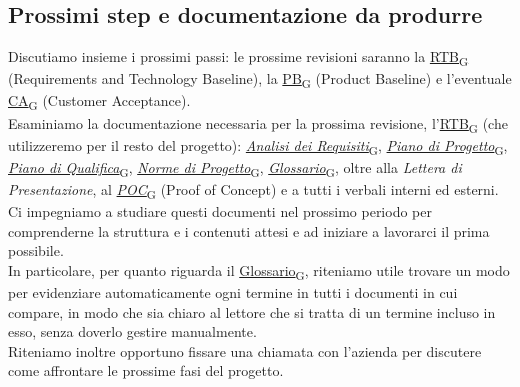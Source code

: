 \documentclass[italian,12pt]{article} %
\begin{document}
\subsection{Prossimi step e documentazione da produrre}
Discutiamo insieme i prossimi passi: le prossime revisioni saranno la \href{https://7last.github.io/docs/rtb/documentazione-interna/glossario#rtb}{RTB\textsubscript{G}}
(Requirements and Technology Baseline), la \href{https://7last.github.io/docs/rtb/documentazione-interna/glossario#pb}{PB\textsubscript{G}} (Product Baseline) e l'eventuale \href{https://7last.github.io/docs/rtb/documentazione-interna/glossario#ca}{CA\textsubscript{G}}
(Customer Acceptance).\\
Esaminiamo la documentazione necessaria per la prossima revisione, l'\href{https://7last.github.io/docs/rtb/documentazione-interna/glossario#rtb}{RTB\textsubscript{G}} (che
utilizzeremo per il resto del progetto): \href{https://7last.github.io/docs/rtb/documentazione-interna/glossario#analisi-dei-requisiti}{\textit{Analisi dei Requisiti}\textsubscript{G}},
\href{https://7last.github.io/docs/rtb/documentazione-interna/glossario#piano-di-progetto}{\textit{Piano di Progetto}\textsubscript{G}}, \href{https://7last.github.io/docs/rtb/documentazione-interna/glossario#piano-di-qualifica}{\textit{Piano di Qualifica}\textsubscript{G}}, \href{https://7last.github.io/docs/rtb/documentazione-interna/glossario#norme-di-progetto}{\textit{Norme di Progetto}\textsubscript{G}},
\href{https://7last.github.io/docs/rtb/documentazione-interna/glossario#glossario}{\textit{Glossario}\textsubscript{G}},  oltre alla \textit{Lettera di Presentazione}, al \href{https://7last.github.io/docs/rtb/documentazione-interna/glossario#poc}{\textit{POC}\textsubscript{G}}
(Proof of Concept) e a tutti i verbali interni ed esterni. Ci impegniamo a studiare
questi documenti nel prossimo periodo per comprenderne la struttura e i contenuti
attesi e ad iniziare a lavorarci il prima possibile. \\
In particolare, per quanto riguarda il \href{https://7last.github.io/docs/rtb/documentazione-interna/glossario#glossario}{Glossario\textsubscript{G}}, riteniamo utile trovare un modo
per evidenziare automaticamente ogni termine in tutti i documenti in cui compare,
in modo che sia chiaro al lettore che si tratta di un termine incluso in esso,
senza doverlo gestire manualmente. \\
Riteniamo inoltre opportuno fissare una chiamata con l'azienda per discutere
come affrontare le prossime fasi del progetto.
\end{document}
